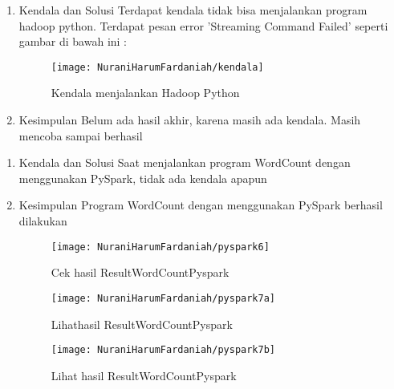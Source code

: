 \begin{enumerate}
\item Kendala dan Solusi
\newline Terdapat kendala tidak bisa menjalankan program hadoop
python. Terdapat pesan error 'Streaming Command Failed' seperti gambar di bawah ini :

\begin{figure}[!ht]
\texttt{[image: NuraniHarumFardaniah/kendala]}
\caption{Kendala menjalankan Hadoop Python}
\label{gam:perkuliahan-25-11}
\end{figure}

\item Kesimpulan
\newline Belum ada hasil akhir, karena masih ada kendala. Masih mencoba sampai berhasil
\end{enumerate}

\begin{enumerate}
\item Kendala dan Solusi
\newline Saat menjalankan program WordCount dengan menggunakan PySpark, tidak ada kendala apapun
\item Kesimpulan
\newline Program WordCount dengan menggunakan PySpark berhasil dilakukan

\newpage
\begin{figure}[!ht]
\texttt{[image: NuraniHarumFardaniah/pyspark6]}
\caption{Cek hasil ResultWordCountPyspark}
\label{gam:perkuliahan-25-11}
\end{figure}

\begin{figure}[!ht]
\texttt{[image: NuraniHarumFardaniah/pyspark7a]}
\caption{Lihathasil ResultWordCountPyspark}
\label{gam:perkuliahan-25-11}
\end{figure}

\begin{figure}[!ht]
\texttt{[image: NuraniHarumFardaniah/pyspark7b]}
\caption{Lihat hasil ResultWordCountPyspark}
\label{gam:perkuliahan-25-11}
\end{figure}
\end{enumerate}

